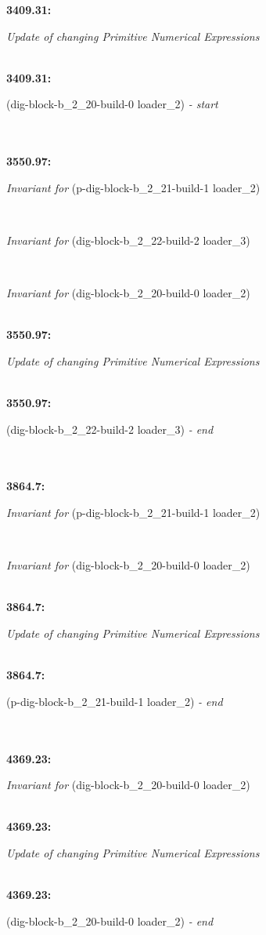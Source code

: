 \documentclass[a4paper,12pt]{article}
\newcommand{\atime}[1]{{\bf #1:}}
\newcommand{\action}[1]{{\sf #1}}
\newcommand{\updatectspne}{{\it Update of changing Primitive Numerical Expressions}}
\newcommand{\actionstart}[1]{#1 {\it - start}}
\newcommand{\actionend}[1]{#1 {\it - end}}
\newcommand{\actioninv}[1]{{\it Invariant for } #1}
\newcommand{\listrow}[1]{\begin{minipage}[t]{11.5cm} #1 \end{minipage}}
\begin{document}
\begin{tabbing}
\atime{3409.31}  \> \listrow{\updatectspne}\\
\atime{3409.31}  \> \listrow{\actionstart{\action{(dig-block-b\_2\_20-build-0 loader\_2)}}}\\
\\\atime{3550.97}  \> \listrow{\actioninv{\action{(p-dig-block-b\_2\_21-build-1 loader\_2)}}}\\ \> \listrow{\actioninv{\action{(dig-block-b\_2\_22-build-2 loader\_3)}}}\\ \> \listrow{\actioninv{\action{(dig-block-b\_2\_20-build-0 loader\_2)}}}\\
\atime{3550.97}  \> \listrow{\updatectspne}\\
\atime{3550.97}  \> \listrow{\actionend{\action{(dig-block-b\_2\_22-build-2 loader\_3)}}}\\
\\\atime{3864.7}  \> \listrow{\actioninv{\action{(p-dig-block-b\_2\_21-build-1 loader\_2)}}}\\ \> \listrow{\actioninv{\action{(dig-block-b\_2\_20-build-0 loader\_2)}}}\\
\atime{3864.7}  \> \listrow{\updatectspne}\\
\atime{3864.7}  \> \listrow{\actionend{\action{(p-dig-block-b\_2\_21-build-1 loader\_2)}}}\\
\\\atime{4369.23}  \> \listrow{\actioninv{\action{(dig-block-b\_2\_20-build-0 loader\_2)}}}\\
\atime{4369.23}  \> \listrow{\updatectspne}\\
\atime{4369.23}  \> \listrow{\actionend{\action{(dig-block-b\_2\_20-build-0 loader\_2)}}}\\
\end{tabbing}
\end{document}
